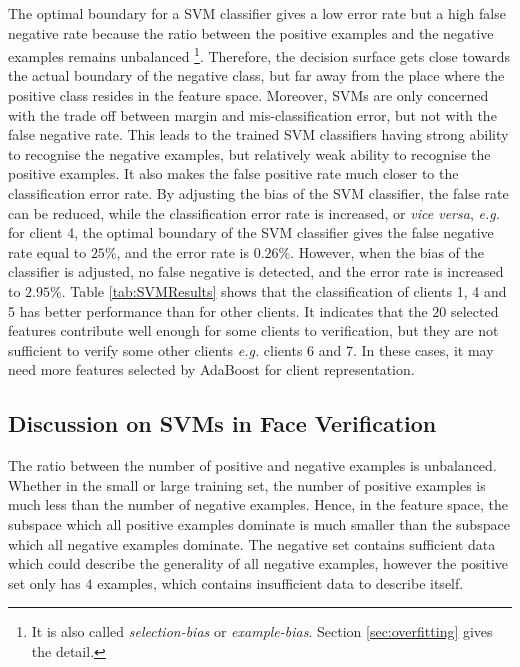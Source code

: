 The optimal boundary for a SVM classifier gives a low error rate but a high false negative rate because the ratio between the positive examples and the negative examples remains unbalanced \footnote{It is also called \textit{selection-bias} or \textit{example-bias}. \mbox{Section} \ref{sec:overfitting} gives the detail.}.  Therefore, the decision surface gets close towards the actual boundary of the negative class, but far away from the place where the positive class resides in the feature space. Moreover, SVMs are only concerned with the trade off between margin and mis-classification error, but not with the false negative rate. This leads to the trained SVM classifiers having strong ability to recognise the negative examples, but relatively weak ability to recognise the positive examples. It also makes the false positive rate much closer to the classification error rate. By adjusting the bias of the SVM classifier, the false  rate can be reduced, while the classification error rate is increased, or {\it vice versa}, {\it e.g.} for client 4, the optimal boundary of the SVM classifier gives the false negative rate equal to $25\%$, and the error rate is $0.26\%$. However, when the bias of the classifier is adjusted, no false negative is detected, and the error rate is increased to $2.95\%$. \mbox{Table} \ref{tab:SVMResults} shows that the classification of clients 1, 4 and 5 has better performance than for other clients. It indicates that the $20$ selected features contribute well enough for some clients to verification, but they are not sufficient to verify some other clients {\it e.g.} clients 6 and 7. In these cases, it may need more features selected by AdaBoost for client representation.

\subsection{Discussion on SVMs in Face Verification}
The ratio between the number of positive and negative examples is unbalanced. Whether in the small or large training set, the number of positive examples is much less than the number of negative examples. Hence, in the feature space, the subspace which all positive examples dominate is much smaller than the subspace which all negative examples dominate. The negative set contains sufficient data which could describe the generality of all negative examples, however the positive set only has $4$ examples, which contains insufficient data to describe itself.

